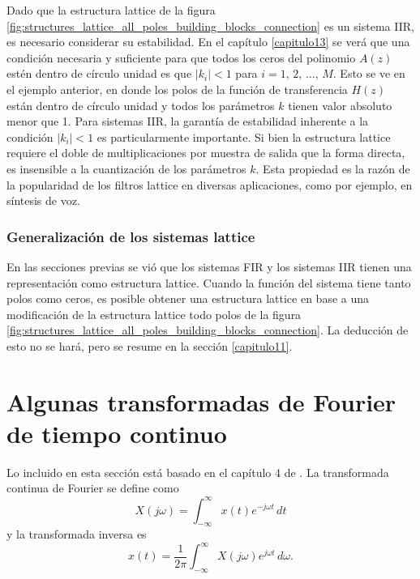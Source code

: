 \documentclass[a4paper]{report}
\begin{document}
Dado que la estructura lattice de la figura \ref{fig:structures_lattice_all_poles_building_blocks_connection} es un sistema IIR, es necesario considerar su estabilidad. En el capítulo \ref{capitulo13} se verá que una condición necesaria y suficiente para que todos los ceros del polinomio \(A(z)\) estén dentro de círculo unidad es que \(|k_i|<1\) para \(i=1,\,2,\,\dots,\,M\). Esto se ve en el ejemplo anterior, en donde los polos de la función de transferencia \(H(z)\) están dentro de círculo unidad y todos los parámetros \(k\) tienen valor absoluto menor que 1. Para sistemas IIR, la garantía de estabilidad inherente a la condición \(|k_i|<1\) es particularmente importante. Si bien la estructura lattice requiere el doble de multiplicaciones por muestra de salida que la forma directa, es insensible a la cuantización de los parámetros \(k\). Esta propiedad es la razón de la popularidad de los filtros lattice en diversas aplicaciones, como por ejemplo, en síntesis de voz.

\subsection{Generalización de los sistemas lattice}

En las secciones previas se vió que los sistemas FIR y los sistemas IIR tienen una representación como estructura lattice. Cuando la función del sistema tiene tanto polos como ceros, es posible obtener una estructura lattice en base a una modificación de la estructura lattice todo polos de la figura \ref{fig:structures_lattice_all_poles_building_blocks_connection}. La deducción de esto no se hará, pero se resume en la sección \ref{capitulo11}.


 
 

 
\appendix 
 
\chapter{Algunas transformadas de Fourier de tiempo continuo}\label{ap:continous_fourier_transforms}

Lo incluido en esta sección está basado en el capítulo 4 de \cite{oppenheim1997signals}. La transformada continua de Fourier se define como
\begin{equation}\label{eq:continuous_fourier_transform_definition}
 X(j\omega) = \int_{-\infty}^{\infty}x(t)e^{-j\omega t}\,dt 
\end{equation}
y la transformada inversa es
\begin{equation}\label{eq:continuous_fourier_transform_definition_inverse}
 x(t)=\frac{1}{2\pi}\int_{-\infty}^{\infty}X(j\omega)e^{j\omega t}\,d\omega.
\end{equation}
\end{document}

